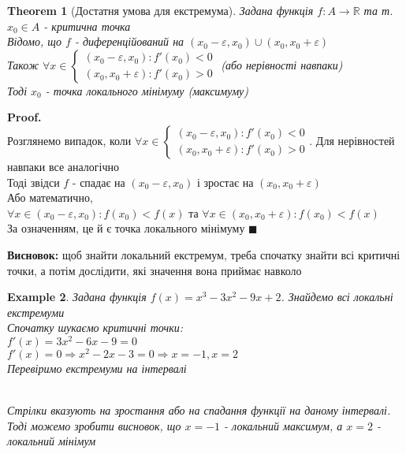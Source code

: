 \documentclass[a4paper, 14pt]{extarticle}
\def\bigline{\vspace{5mm}\\}
\theoremstyle{theoremdd}
\newtheorem{theorem}{Theorem}[subsection]
\theoremstyle{theoremdd}
\theoremstyle{theoremdd}
\theoremstyle{theoremdd}
\newtheorem{example}[theorem]{Example}
\theoremstyle{theoremdd}
\theoremstyle{theoremdd}
\theoremstyle{theoremdd}
\theoremstyle{theoremdd}
\newenvironment{pf}{\vspace*{-3mm} \textbf{Proof. \\}}{$\blacksquare$}
\begin{document}
\begin{theorem}[Достатня умова для екстремума]
Задана функція $f: A \to \mathbb{R}$ та т. $x_0 \in A$ - критична точка\\
Відомо, що $f$ - диференційований на $(x_0-\varepsilon,x_0) \cup (x_0, x_0+\varepsilon)$\\
Також $\forall x \in \begin{cases} (x_0-\varepsilon,x_0): f'(x_0) < 0 \\ (x_0,x_0+\varepsilon): f'(x_0) > 0 \end{cases}$ (або нерівності навпаки)\\
Тоді $x_0$ - точка локального мінімуму (максимуму)
\end{theorem}
\begin{pf}
Розглянемо випадок, коли $\forall x \in \begin{cases} (x_0-\varepsilon,x_0): f'(x_0) < 0 \\ (x_0,x_0+\varepsilon): f'(x_0) > 0 \end{cases}$. Для нерівностей навпаки все аналогічно\\
Тоді звідси $f$ - спадає на $(x_0 - \varepsilon, x_0)$ і зростає на $(x_0, x_0 + \varepsilon)$\\
Або математично, \\ $\forall x \in (x_0-\varepsilon, x_0): f(x_0) < f(x)$ та $\forall x \in (x_0, x_0+\varepsilon): f(x_0) < f(x)$\\
За означенням, це й є точка локального мінімуму
\end{pf}

\textbf{Висновок:} щоб знайти локальний екстремум, треба спочатку знайти всі критичні точки, а потім дослідити, які значення вона приймає навколо

\begin{example}
Задана функція $f(x) = x^3-3x^2-9x+2$. Знайдемо всі локальні екстремуми\\
Спочатку шукаємо критичні точки:\\
$f'(x) = 3x^2-6x-9 = 0$\\
$f'(x) = 0 \Rightarrow x^2-2x-3 = 0 \Rightarrow x = -1,x = 2$\\
Перевіримо екстремуми на інтервалі
\bigline
{}
\\
Стрілки вказують на зростання або на спадання функції на даному інтервалі. Тоді можемо зробити висновок, що $x=-1$ - локальний максимум, а $x=2$ - локальний мінімум
\end{example}
\end{document}

